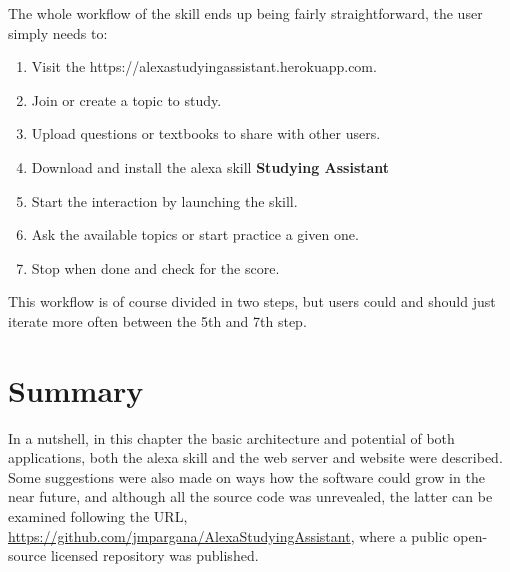 The whole workflow of the skill ends up being fairly straightforward, the user 
simply needs to:

\begin{enumerate}
        \item Visit the https://alexastudyingassistant.herokuapp.com.
        \item Join or create a topic to study.
        \item Upload questions or textbooks to share with other users.
        \item Download and install the alexa skill \textbf{Studying Assistant}
        \item Start the interaction by launching the skill.
        \item Ask the available topics or start practice a given one.
        \item Stop when done and check for the score.
\end{enumerate}

This workflow is of course divided in two steps, but users could and should 
just iterate more often between the 5th and 7th step.


\section{Summary}

In a nutshell, in this chapter the basic architecture and potential of both
applications, both the alexa skill and the web server and website were described.
Some suggestions were also made on ways how the software could grow in the near 
future, and although all the source code was unrevealed, the latter can be examined
following the URL, 
\href{https://github.com/jmpargana/AlexaStudyingAssistant}{https://github.com/jmpargana/AlexaStudyingAssistant}, where a
public open-source licensed repository was published.